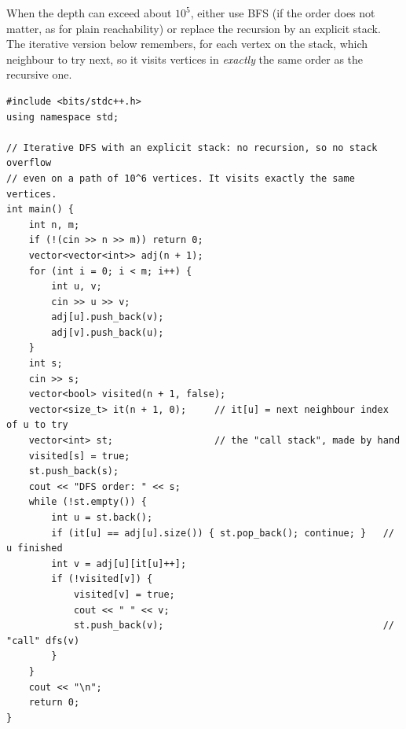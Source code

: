 \begin{diagrambox}
\end{diagrambox}

When the depth can exceed about $10^5$, either use BFS (if the order does not matter, as for plain reachability) or replace the recursion by an explicit stack. The iterative version below remembers, for each vertex on the stack, which neighbour to try next, so it visits vertices in \emph{exactly} the same order as the recursive one.

\begin{lstlisting}[style=cpp]
#include <bits/stdc++.h>
using namespace std;

// Iterative DFS with an explicit stack: no recursion, so no stack overflow
// even on a path of 10^6 vertices. It visits exactly the same vertices.
int main() {
    int n, m;
    if (!(cin >> n >> m)) return 0;
    vector<vector<int>> adj(n + 1);
    for (int i = 0; i < m; i++) {
        int u, v;
        cin >> u >> v;
        adj[u].push_back(v);
        adj[v].push_back(u);
    }
    int s;
    cin >> s;
    vector<bool> visited(n + 1, false);
    vector<size_t> it(n + 1, 0);     // it[u] = next neighbour index of u to try
    vector<int> st;                  // the "call stack", made by hand
    visited[s] = true;
    st.push_back(s);
    cout << "DFS order: " << s;
    while (!st.empty()) {
        int u = st.back();
        if (it[u] == adj[u].size()) { st.pop_back(); continue; }   // u finished
        int v = adj[u][it[u]++];
        if (!visited[v]) {
            visited[v] = true;
            cout << " " << v;
            st.push_back(v);                                       // "call" dfs(v)
        }
    }
    cout << "\n";
    return 0;
}
\end{lstlisting}

